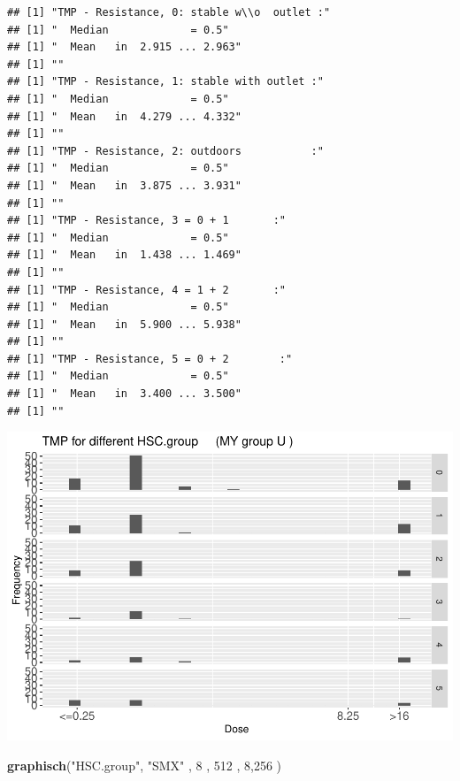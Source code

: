 \documentclass[
]{article}
\newenvironment{Shaded}{\begin{snugshade}}{\end{snugshade}}
\newcommand{\DecValTok}[1]{\textcolor[rgb]{0.00,0.00,0.81}{#1}}
\newcommand{\KeywordTok}[1]{\textcolor[rgb]{0.13,0.29,0.53}{\textbf{#1}}}
\newcommand{\NormalTok}[1]{#1}
\newcommand{\StringTok}[1]{\textcolor[rgb]{0.31,0.60,0.02}{#1}}
\begin{document}
\begin{verbatim}
## [1] "TMP - Resistance, 0: stable w\\o  outlet :"
## [1] "  Median             = 0.5"
## [1] "  Mean   in  2.915 ... 2.963"
## [1] ""
## [1] "TMP - Resistance, 1: stable with outlet :"
## [1] "  Median             = 0.5"
## [1] "  Mean   in  4.279 ... 4.332"
## [1] ""
## [1] "TMP - Resistance, 2: outdoors           :"
## [1] "  Median             = 0.5"
## [1] "  Mean   in  3.875 ... 3.931"
## [1] ""
## [1] "TMP - Resistance, 3 = 0 + 1       :"
## [1] "  Median             = 0.5"
## [1] "  Mean   in  1.438 ... 1.469"
## [1] ""
## [1] "TMP - Resistance, 4 = 1 + 2       :"
## [1] "  Median             = 0.5"
## [1] "  Mean   in  5.900 ... 5.938"
## [1] ""
## [1] "TMP - Resistance, 5 = 0 + 2        :"
## [1] "  Median             = 0.5"
## [1] "  Mean   in  3.400 ... 3.500"
## [1] ""
\end{verbatim}

\includegraphics{Verteilungen_files/figure-latex/unnamed-chunk-55-1.pdf}

\begin{Shaded}
\begin{Highlighting}[]
  \KeywordTok{graphisch}\NormalTok{(}\StringTok{"HSC.group"}\NormalTok{, }\StringTok{"SMX"}\NormalTok{ , }\DecValTok{8}\NormalTok{    , }\DecValTok{512}\NormalTok{   ,   }\DecValTok{8}\NormalTok{,}\DecValTok{256}\NormalTok{    ) }
\end{Highlighting}
\end{Shaded}
\end{document}
